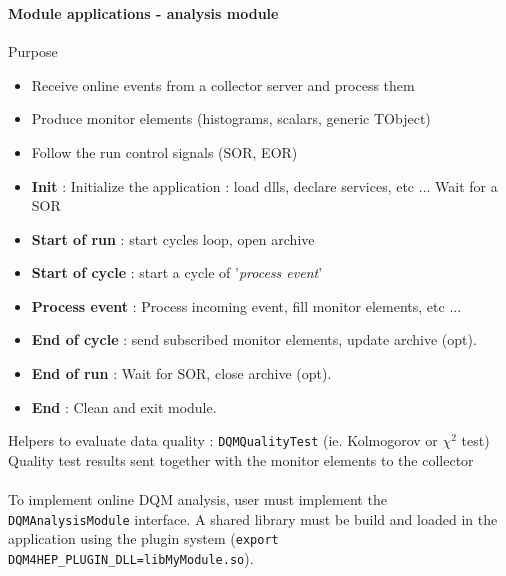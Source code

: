 \documentclass[8pt]{beamer}
\begin{document}
  \begin{frame}[containsverbatim]
    \frametitle{\secname}
    \framesubtitle{Module applications - analysis module}

    \begin{minipage}{0.78\textwidth}
      \begin{block}{Purpose}
        \begin{itemize}
          \item Receive online events from a collector server and process them
          \item Produce monitor elements (histograms, scalars, generic TObject)
          \item Follow the run control signals (SOR, EOR)
        \end{itemize}
      \end{block}

      \begin{itemize}
        \item \textbf{Init} : Initialize the application : load dlls, declare services, etc ... Wait for a SOR
        \item \textbf{Start of run} : start cycles loop, open archive
        \item \textbf{Start of cycle} : start a cycle of '\textit{process event}'
        \item \textbf{Process event} : Process incoming event, fill monitor elements, etc ...
        \item \textbf{End of cycle} : send subscribed monitor elements, update archive (opt).
        \item \textbf{End of run} : Wait for SOR, close archive (opt).
        \item \textbf{End} : Clean and exit module.
      \end{itemize}
      Helpers to evaluate data quality : \verb|DQMQualityTest| (ie. Kolmogorov or $\chi^2$ test) \\
      Quality test results sent together with the monitor elements to the collector \\
      ~ \\
      To implement online DQM analysis, user must implement the \verb|DQMAnalysisModule| interface. A shared library must be build and loaded in the application using the plugin system (\verb|export DQM4HEP_PLUGIN_DLL=libMyModule.so|). \\


\end{minipage}
\end{frame}
\end{document}
